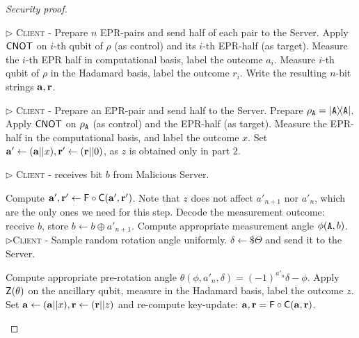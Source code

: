 \begin{proof}[Security proof]
\begin{reduction}
    \caption{Blind State Injection, EPR-Client, malicious Server (reduction)}
    \label{protocol:blind-gate-reduction}
    \begin{algorithmic}[1]
        \State $\triangleright$ \textsc{Client - } Prepare $n$ EPR-pairs and send half of each pair to the Server.
            \State Apply $\mathsf{CNOT}$ on $i$-th qubit of $\rho$ (as control) and its $i$-th EPR-half (as target).
            \State Measure the $i$-th EPR half in computational basis, label the outcome $a_i$.
            \State Measure $i$-th qubit of $\rho$ in the Hadamard basis, label the outcome $r_i$.
        \EndFor
        \State Write the resulting $n$-bit strings $\mathbf a, \mathbf r$.
        \EndProcedure

        \State$\triangleright$ \textsc{Client - } Prepare an EPR-pair and send half to the Server.
        \State Prepare $\rho_{\mathtt{A}}=\ketbra{\mathtt{A}}$.
        \State Apply $\mathsf{CNOT}$ on $\rho_{\mathtt{A}}$ (as control) and the EPR-half (as target).
        \State Measure the EPR-half in the computational basis, and label the outcome $x$.
        \State Set $\mathbf a' \gets (\mathbf a ||x), \mathbf r'\gets (\mathbf r||0)$, as $z$ is obtained only in part 2.
        \EndProcedure

        \State$\triangleright$ \textsc{Client - } receives bit $b$ from Malicious Server.

        \State Compute $\mathbf a', \mathbf r' \gets \mathsf{F}\circ \mathsf{C}(\mathbf a', \mathbf r')$. Note that $z$ does not affect $a'_{n+1}$ nor $a'_n$, which are the only ones we need for this step.
        \State Decode the measurement outcome: receive $b$, store $b\gets b\oplus a'_{n+1}$.
        \State Compute appropriate measurement angle $\phi(\mathtt{A}, b)$.
        \EndProcedure
        \State $\triangleright$\textsc{Client - } Sample random rotation angle uniformly. $\delta\gets\$\Theta$ and send it to the Server.

        \EndProcedure

        \State Compute appropriate pre-rotation angle $\theta(\phi, a'_n, \delta)=(-1)^{a'_n}\delta - \phi$.
        \State Apply $\mathsf{Z}(\theta)$ on the ancillary qubit, measure in the Hadamard basis, label the outcome $z$.
        \State Set $\mathbf a \gets (\mathbf a ||x), \mathbf r\gets (\mathbf r||z)$ and re-compute key-update: $\mathbf a, \mathbf r = \mathsf{F}\circ \mathsf{C}(\mathbf a, \mathbf r)$.
        \EndProcedure


\end{algorithmic}
\end{reduction}
\end{proof}
